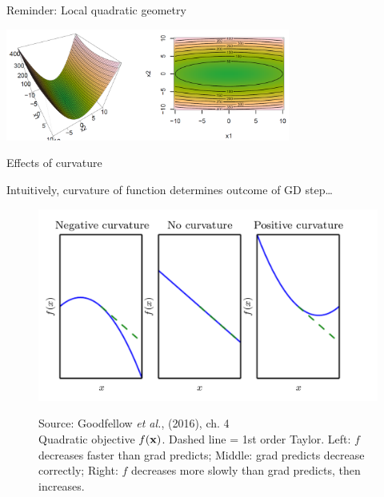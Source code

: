 \documentclass[11pt,compress,t,notes=noshow, xcolor=table]{beamer}
\begin{document}
\begin{vbframe}{Reminder: Local quadratic geometry}
	\begin{center}
		\includegraphics[width=0.7\textwidth]{figure_man/ill-con.png}
	\end{center}

\end{vbframe}


\begin{vbframe} {Effects of curvature}

	Intuitively, curvature of function determines outcome of GD step\dots
	
	\begin{figure}
		\begin{center}
			\includegraphics[width=.8\textwidth]{figure_man/curvature.png}
		\end{center}
		\tiny{Source: Goodfellow \emph{et al.}, (2016), ch. 4} ~\\
		\footnotesize{Quadratic objective $f(\mathbf{x})$.
			Dashed line = 1st order Taylor. Left: $f$ decreases faster than grad predicts; Middle: grad predicts decrease correctly; Right: $f$ decreases more slowly than grad predicts, then increases. }
	\end{figure}
\end{vbframe}

	
\end{document}
